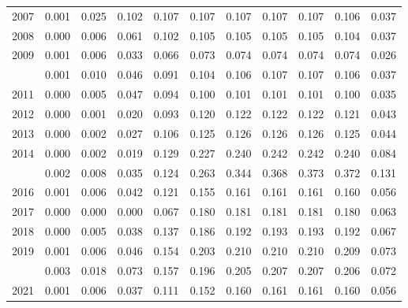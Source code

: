 \documentclass[
]{article}
\begin{document}
\begin{longtable}[t]{lrrrrrrrrrr}
2007 & 0.001 & 0.025 & 0.102 & 0.107 & 0.107 & 0.107 & 0.107 & 0.107 & 0.106 & 0.037\\
2008 & 0.000 & 0.006 & 0.061 & 0.102 & 0.105 & 0.105 & 0.105 & 0.105 & 0.104 & 0.037\\
2009 & 0.001 & 0.006 & 0.033 & 0.066 & 0.073 & 0.074 & 0.074 & 0.074 & 0.074 & 0.026\\
\addlinespace
2010 & 0.001 & 0.010 & 0.046 & 0.091 & 0.104 & 0.106 & 0.107 & 0.107 & 0.106 & 0.037\\
2011 & 0.000 & 0.005 & 0.047 & 0.094 & 0.100 & 0.101 & 0.101 & 0.101 & 0.100 & 0.035\\
2012 & 0.000 & 0.001 & 0.020 & 0.093 & 0.120 & 0.122 & 0.122 & 0.122 & 0.121 & 0.043\\
2013 & 0.000 & 0.002 & 0.027 & 0.106 & 0.125 & 0.126 & 0.126 & 0.126 & 0.125 & 0.044\\
2014 & 0.000 & 0.002 & 0.019 & 0.129 & 0.227 & 0.240 & 0.242 & 0.242 & 0.240 & 0.084\\
\addlinespace
2015 & 0.002 & 0.008 & 0.035 & 0.124 & 0.263 & 0.344 & 0.368 & 0.373 & 0.372 & 0.131\\
2016 & 0.001 & 0.006 & 0.042 & 0.121 & 0.155 & 0.161 & 0.161 & 0.161 & 0.160 & 0.056\\
2017 & 0.000 & 0.000 & 0.000 & 0.067 & 0.180 & 0.181 & 0.181 & 0.181 & 0.180 & 0.063\\
2018 & 0.000 & 0.005 & 0.038 & 0.137 & 0.186 & 0.192 & 0.193 & 0.193 & 0.192 & 0.067\\
2019 & 0.001 & 0.006 & 0.046 & 0.154 & 0.203 & 0.210 & 0.210 & 0.210 & 0.209 & 0.073\\
\addlinespace
2020 & 0.003 & 0.018 & 0.073 & 0.157 & 0.196 & 0.205 & 0.207 & 0.207 & 0.206 & 0.072\\
2021 & 0.001 & 0.006 & 0.037 & 0.111 & 0.152 & 0.160 & 0.161 & 0.161 & 0.160 & 0.056\\*
\end{longtable}
\end{document}
